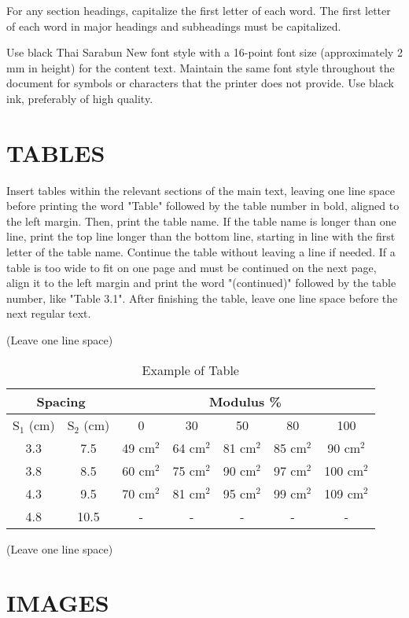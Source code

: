 For any section headings, capitalize the first letter of each word. The first letter of each word in major headings and subheadings must be capitalized.

Use black Thai Sarabun New font style with a 16-point font size (approximately 2 mm in height) for the content text. Maintain the same font style throughout the document for symbols or characters that the printer does not provide. Use black ink, preferably of high quality.

\section{TABLES}

Insert tables within the relevant sections of the main text, leaving one line space before printing the word "Table" followed by the table number in bold, aligned to the left margin. Then, print the table name. If the table name is longer than one line, print the top line longer than the bottom line, starting in line with the first letter of the table name. Continue the table without leaving a line if needed. If a table is too wide to fit on one page and must be continued on the next page, align it to the left margin and print the word "(continued)" followed by the table number, like "Table 3.1". After finishing the table, leave one line space before the next regular text.

(Leave one line space)

\begin{table}[h]
\centering
\begin{tabular}{|c|c|c|c|c|c|c|}
\hline
\multicolumn{2}{|c|}{Spacing} & \multicolumn{5}{c|}{Modulus \%} \\
\hline
S$_1$ (cm) & S$_2$ (cm) & 0 & 30 & 50 & 80 & 100 \\
\hline
3.3 & 7.5 & 49 cm$^2$ & 64 cm$^2$ & 81 cm$^2$ & 85 cm$^2$ & 90 cm$^2$ \\
3.8 & 8.5 & 60 cm$^2$ & 75 cm$^2$ & 90 cm$^2$ & 97 cm$^2$ & 100 cm$^2$ \\
4.3 & 9.5 & 70 cm$^2$ & 81 cm$^2$ & 95 cm$^2$ & 99 cm$^2$ & 109 cm$^2$ \\
4.8 & 10.5 & - & - & - & - & - \\
\hline
\end{tabular}
\caption{Example of Table}
\label{tab:3.1}
\end{table}

(Leave one line space)

\section{IMAGES}

